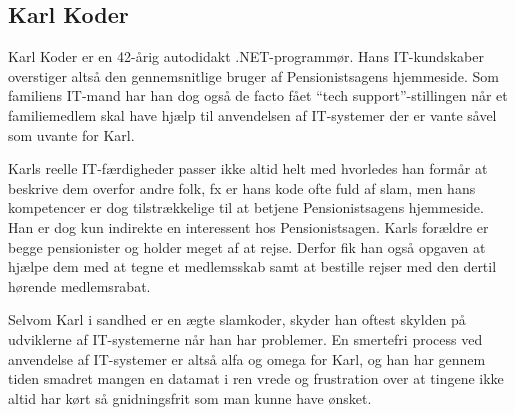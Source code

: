 \subsection{Karl Koder}

Karl Koder er en 42-årig autodidakt .NET-programmør. Hans IT-kundskaber
overstiger altså den gennemsnitlige bruger af Pensionistsagens
hjemmeside. Som familiens IT-mand har han dog også de facto fået ``tech
support''-stillingen når et familiemedlem skal have hjælp til anvendelsen af
IT-systemer der er vante såvel som uvante for Karl.

Karls reelle IT-færdigheder passer ikke altid helt med hvorledes han formår
at beskrive dem overfor andre folk, fx er hans kode ofte fuld af slam, men
hans kompetencer er dog tilstrækkelige til at betjene Pensionistsagens
hjemmeside. Han er dog kun indirekte en interessent hos Pensionistsagen. Karls
forældre er begge pensionister og holder meget af at rejse. Derfor fik han
også opgaven at hjælpe dem med at tegne et medlemsskab samt at bestille
rejser med den dertil hørende medlemsrabat.

Selvom Karl i sandhed er en ægte slamkoder, skyder han oftest skylden på
udviklerne af IT-systemerne når han har problemer. En smertefri process ved
anvendelse af IT-systemer er altså alfa og omega for Karl, og han har gennem
tiden smadret mangen en datamat i ren vrede og frustration over at tingene
ikke altid har kørt så gnidningsfrit som man kunne have ønsket.
